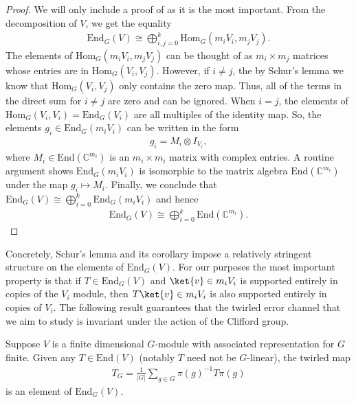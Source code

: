 \begin{proof}
    We will only include a proof of  as it is the most important.
    From the decomposition of $V$, we get the equality
    \begin{align}
        \mathrm{End}_G(V) \cong \bigoplus_{i,j = 0}^k \mathrm{Hom}_G(m_iV_i,m_jV_j).
    \end{align}
    The elements of $\mathrm{Hom}_G(m_i V_i, m_j V_j)$ can be thought of as $m_i \times m_j$ matrices whose entries are in $\mathrm{Hom}_G(V_i, V_j)$. 
    However, if $i \neq j$, the by Schur's lemma we know that $\mathrm{Hom}_G(V_i, V_j)$ only contains the zero map. 
    Thus, all of the terms in the direct sum for $i \neq j$ are zero and can be ignored. 
    When $i = j$, the elements of $\mathrm{Hom}_G(V_i,V_i) = \mathrm{End}_G(V_i)$ are all multiples of the identity map. 
    So, the elements $g_i \in \mathrm{End}_G(m_iV_i)$ can be written in the form
    \begin{align}
        g_i = M_i \otimes I_{V_i},
    \end{align}
    where $M_i \in \mathrm{End}(\mathbb{C}^{m_i})$ is an $m_i \times m_i$ matrix with complex entries. 
    A routine argument shows $\mathrm{End}_G(m_iV_i)$ is isomorphic to the matrix algebra $\mathrm{End}(\mathbb{C}^{m_i})$ under the map $g_i \mapsto M_i$.
    Finally, we conclude that $\mathrm{End}_G(V) \cong \bigoplus_{i = 0}^k \mathrm{End}_G(m_i V_i)$ and hence
    \begin{align}
        \mathrm{End}_G(V) \cong \bigoplus_{i=0}^k \mathrm{End}(\mathbb{C}^{m_i}).
    \end{align}
\end{proof}

Concretely, Schur's lemma and its corollary impose a relatively stringent structure on the elements of $\mathrm{End}_G(V)$. 
For our purposes the most important property is that if $T \in \mathrm{End}_G(V)$ and $\ket{v} \in m_i V_i$ is supported entirely in copies of the $V_i$ module, then $T\ket{v} \in m_i V_i$ is also supported entirely in copies of $V_i$. 
The following result guarantees that the twirled error channel that we aim to study is invariant under the action of the Clifford group.

\begin{lemma}[Twirling] \label{lem:twirling}
    Suppose $V$ is a finite dimensional $G$-module with associated representation for $G$ finite. Given any $T \in \mathrm{End}(V)$ (notably $T$ need not be $G$-linear), the twirled map
    \begin{align}
        T_G = \frac{1}{|G|} \sum_{g \in G} \pi(g)^{-1} T \pi(g)
    \end{align}
    is an element of $\mathrm{End}_G(V)$.
\end{lemma}

